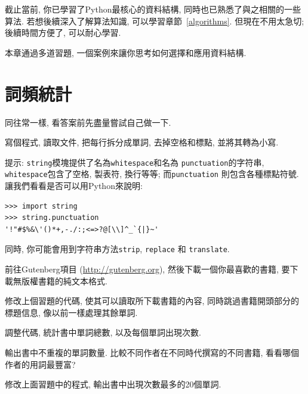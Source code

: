 \documentclass[10pt]{book}
\begin{document}
截止當前, 你已學習了Python最核心的資料結構, 
同時也已熟悉了與之相關的一些算法. 
若想後續深入了解算法知識, 可以學習章節~\ref{algorithms}. 
但現在不用太急切; 後續時間方便了, 可以耐心學習. 

本章通過多道習題, 一個案例來讓你思考如何選擇和應用資料結構. 


\section{詞頻統計}
\label{analysis}

同往常一樣, 看答案前先盡量嘗試自己做一下. 

\begin{exercise}

寫個程式, 讀取文件, 把每行拆分成單詞, 去掉空格和標點, 並將其轉為小寫. 

提示: {\tt string}模塊提供了名為{\tt whitespace}和名為 
{\tt  punctuation}的字符串, {\tt whitespace}包含了空格, 製表符, 換行等等; 而{\tt punctuation} 則包含各種標點符號. 
讓我們看看是否可以用Python來說明:

\begin{verbatim}
>>> import string
>>> string.punctuation
'!"#$%&\'()*+,-./:;<=>?@[\\]^_`{|}~'
\end{verbatim}
%
同時, 你可能會用到字符串方法{\tt strip},
{\tt replace} 和 {\tt translate}.

\end{exercise}


\begin{exercise}

前往Gutenberg項目 (\url{http://gutenberg.org}), 然後下載一個你最喜歡的書籍, 
要下載無版權書籍的純文本格式. 

修改上個習題的代碼, 使其可以讀取所下載書籍的內容, 同時跳過書籍開頭部分的標題信息, 像以前一樣處理其餘單詞. 

調整代碼, 統計書中單詞總數, 以及每個單詞出現次數. 

輸出書中不重複的單詞數量. 
比較不同作者在不同時代撰寫的不同書籍, 看看哪個作者的用詞最豐富?
\end{exercise}


\begin{exercise}

修改上面習題中的程式, 輸出書中出現次數最多的20個單詞. 

\end{exercise}
\end{document}
